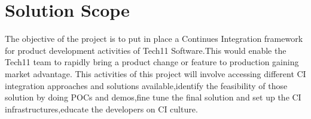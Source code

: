 \documentclass[12pt,a4paper,oneside]{report}
\begin{document}
\section{Solution Scope}
The objective of the project is to put in place a Continues Integration framework for
product development activities of Tech11 Software.This would enable the Tech11 team to
rapidly bring a product change or feature to production gaining market advantage. This activities
of this project will involve accessing different CI integration approaches and solutions
available,identify the feasibility of those solution by doing POCs and demos,fine tune the final
solution and set up the CI infrastructures,educate the developers on CI culture.

\end{document}
